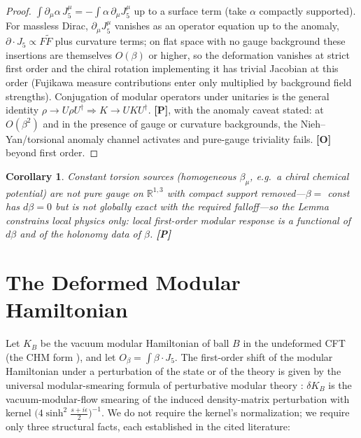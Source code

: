 \documentclass[11pt]{article}
\newtheorem{corollary}[theorem]{Corollary}
\theoremstyle{definition}
\newcommand{\pP}{\textbf{[P]}}
\newcommand{\pO}{\textbf{[O]}}
\begin{document}
\begin{proof}
$\int\partial_\mu\alpha\,J_5^\mu=-\int\alpha\,\partial_\mu J_5^\mu$ up to a
surface term (take $\alpha$ compactly supported). For massless Dirac,
$\partial_\mu J_5^\mu$ vanishes as an operator equation up to the anomaly,
$\partial\!\cdot\!J_5\propto F\tilde F$ plus curvature terms; on flat space
with no gauge background these insertions are themselves $O(\beta)$ or
higher, so the deformation vanishes at strict first order and the chiral
rotation implementing it has trivial Jacobian at this order (Fujikawa
measure contributions enter only multiplied by background field strengths).
Conjugation of modular operators under unitaries is the general identity
$\rho\to U\rho U^\dagger \Rightarrow K\to UKU^\dagger$. \pP{}, with the
anomaly caveat stated: at $O(\beta^2)$ and in the presence of gauge or
curvature backgrounds, the Nieh--Yan/torsional anomaly channel
\cite{NiehYan1982,ChandiaZanelli1997} activates and pure-gauge triviality
fails. \pO{} beyond first order.
\end{proof}

\begin{corollary}
Constant torsion sources (homogeneous $\beta_\mu$, e.g.\ a chiral chemical
potential) are \emph{not} pure gauge on $\mathbb{R}^{1,3}$ with compact
support removed---$\beta=$ const has $d\beta=0$ but is not globally exact
with the required falloff---so the Lemma constrains local physics only:
local first-order modular response is a functional of $d\beta$ and of the
holonomy data of $\beta$. \pP{}
\end{corollary}

\section{The Deformed Modular Hamiltonian}

Let $K_B$ be the vacuum modular Hamiltonian of ball $B$ in the undeformed
CFT (the CHM form \cite{CHM2011}), and let
$O_\beta=\int\beta\cdot J_5$. The first-order shift of the modular
Hamiltonian under a perturbation of the state or of the theory is given by
the universal modular-smearing formula of perturbative modular theory
\cite{FLPW2016,SarosiUgajin2018}: $\delta K_B$ is the vacuum-modular-flow
smearing of the induced density-matrix perturbation with kernel
$\big(4\sinh^2\!\tfrac{s+i\epsilon}{2}\big)^{-1}$. We do not require the
kernel's normalization; we require only three structural facts, each
established in the cited literature:
\end{document}

